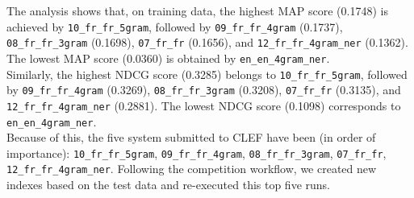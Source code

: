 The analysis shows that, on training data, the highest MAP score (0.1748) is achieved by \texttt{10\_fr\_fr\_5gram},
followed by
\texttt{09\_fr\_fr\_4gram} (0.1737),
\texttt{08\_fr\_fr\_3gram} (0.1698),
\texttt{07\_fr\_fr} (0.1656), and
\texttt{12\_fr\_fr\_4gram\_ner} (0.1362).
The lowest MAP score (0.0360) is obtained by \texttt{en\_en\_4gram\_ner}.\\

Similarly, the highest NDCG score (0.3285) belongs to \texttt{10\_fr\_fr\_5gram}, followed by
\texttt{09\_fr\_fr\_4gram} (0.3269),
\texttt{08\_fr\_fr\_3gram} (0.3208),
\texttt{07\_fr\_fr} (0.3135), and
\texttt{12\_fr\_fr\_4gram\_ner} (0.2881).
The lowest NDCG score (0.1098) corresponds to \texttt{en\_en\_4gram\_ner}.\\

Because of this, the five system submitted to CLEF have been (in order of importance): \texttt{10\_fr\_fr\_5gram},
\texttt{09\_fr\_fr\_4gram}, \texttt{08\_fr\_fr\_3gram}, \texttt{07\_fr\_fr}, \texttt{12\_fr\_fr\_4gram\_ner}.
Following the competition workflow, we created new indexes based on the test data and re-executed this top five runs.\\

